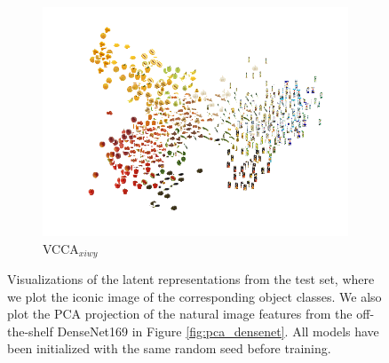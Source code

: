 \begin{figure}[t]
\begin{subfigure}[b]{0.3\textwidth}
         \centering
         \includegraphics[width=\textwidth]{PaperB/figures_and_tables/latent_space_visualizations/pca_latents_vcca_xiwy_seed2.png}
         \caption{VCCA$_{x i w y}$}
         \label{fig:pca_vcca_xiwy}
     \end{subfigure} 
    \vspace{-2mm}
    \caption{Visualizations of the latent representations from the test set, where we plot the iconic image of the corresponding object classes. We also plot the PCA projection of the natural image features from the off-the-shelf DenseNet169 in Figure \ref{fig:pca_densenet}. All models have been initialized with the same random seed before training. %
    }
    \label{fig:2d_visualizations_pca}
    \vspace{-3mm}
\end{figure}
